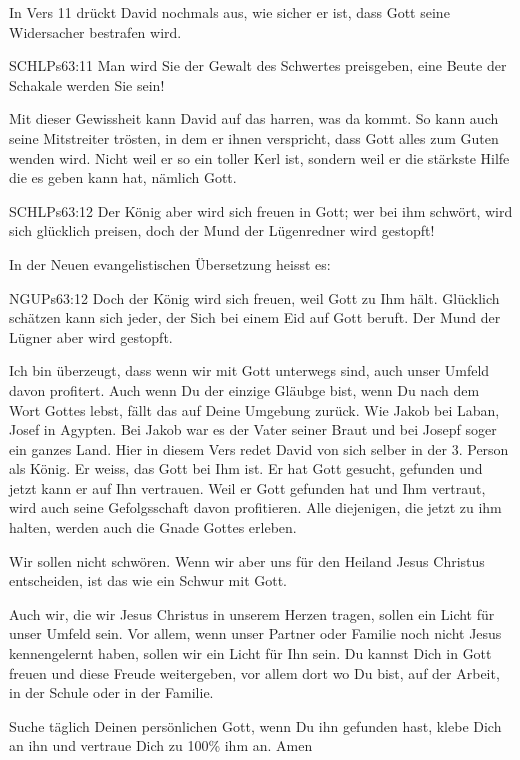 \documentclass[14pt]{../../inc/mybib}
\begin{document}
\begin{block}
    In Vers 11 drückt David nochmals aus, wie sicher er ist, dass Gott seine Widersacher bestrafen wird.
    \begin{bibelbox}{SCHL}{Ps}{63:11}
        Man wird Sie der Gewalt des Schwertes preisgeben, eine Beute der Schakale werden Sie sein!
    \end{bibelbox}
    Mit dieser Gewissheit kann David auf das harren, was da kommt. So kann auch seine Mitstreiter trösten, in dem er ihnen verspricht, dass Gott alles zum Guten wenden wird. 
    Nicht weil er so ein toller Kerl ist, sondern weil er die stärkste Hilfe die es geben kann hat, nämlich Gott. 
\end{block}
\begin{block}
    \begin{bibelbox}{SCHL}{Ps}{63:12}
        Der König aber wird sich freuen in Gott; wer bei ihm schwört, wird sich glücklich preisen, doch der Mund der Lügenredner wird gestopft!
    \end{bibelbox}
    In der Neuen evangelistischen Übersetzung heisst es:
    \begin{bibelbox}{NGU}{Ps}{63:12}
        Doch der König wird sich freuen, weil Gott zu Ihm hält. Glücklich schätzen kann sich jeder, der Sich bei einem Eid auf Gott beruft. Der Mund der Lügner aber wird gestopft.
    \end{bibelbox}
    \begin{block}
        Ich bin überzeugt, dass wenn wir mit Gott unterwegs sind, auch unser Umfeld davon profitert. Auch wenn Du der einzige Gläubge bist, wenn Du nach dem Wort Gottes lebst, fällt das auf Deine Umgebung zurück. Wie Jakob bei Laban, Josef in Agypten. Bei Jakob war es der Vater seiner Braut und bei Josepf soger ein ganzes Land.
        Hier in diesem Vers redet David von sich selber in der 3. Person als König. Er weiss, das Gott bei Ihm ist. Er hat Gott gesucht, gefunden und jetzt kann er auf Ihn vertrauen. Weil er Gott gefunden hat und Ihm vertraut, wird auch seine Gefolgsschaft davon profitieren. Alle diejenigen, die jetzt zu ihm halten, werden auch die Gnade Gottes erleben.

        Wir sollen nicht schwören. Wenn wir aber uns für den Heiland Jesus Christus entscheiden, ist das wie ein Schwur mit Gott.
    \end{block}
    \begin{block}
        Auch wir, die wir Jesus Christus in unserem Herzen tragen, sollen ein Licht für unser Umfeld sein. Vor allem, wenn unser Partner oder Familie noch nicht Jesus kennengelernt haben, sollen wir ein Licht für Ihn sein.        
        Du kannst Dich in Gott freuen und diese Freude weitergeben, vor allem dort wo Du bist, auf der Arbeit, in der Schule oder in der Familie.
\end{block}

    Suche täglich Deinen persönlichen Gott, wenn Du ihn gefunden hast, klebe Dich an ihn und vertraue Dich zu 100\% ihm an.
    Amen

    \beten
\end{block}  
\end{document}

